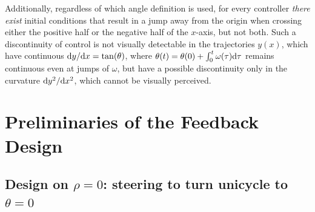 \documentclass[journal,twoside,web]{ieeecolor}
\theoremstyle{definition}
\begin{document}

Additionally, regardless of which angle definition is used, for every controller \textit{there exist} initial conditions that result in a jump away from the origin when crossing either the positive half or the negative half of the $x$-axis, but not both. Such a discontinuity of control is not visually detectable in the trajectories $y(x)$, which have continuous ${\rm d}y/{\rm d}x=\tan(\theta)$, where $\theta(t)=\theta(0)+\int_0^t \omega(\tau){
\rm d}\tau$ remains continuous even at jumps of $\omega$, but have a possible discontinuity only in the curvature ${\rm d}y^2/{\rm d}x^2$, which cannot be visually perceived. 

\section{Preliminaries of the Feedback Design}
\label{sec-preliminaries}

\subsection[Design on rho=0: steering to turn unicycle to theta=0]%
{Design on $\rho=0$: steering to turn unicycle to $\theta=0$}
\end{document}
